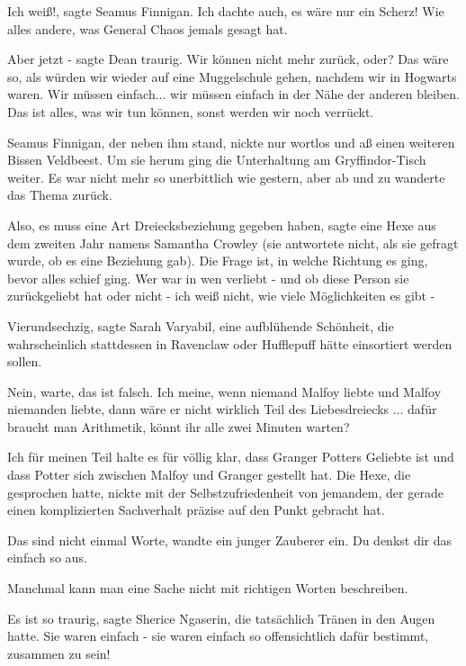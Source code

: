 \glqq{}Ich weiß!\grqq{}, sagte Seamus Finnigan. \glqq{}Ich dachte auch, es wäre
nur ein Scherz! Wie alles andere, was General Chaos jemals gesagt hat.\grqq{}

\glqq{}Aber jetzt -\grqq{} sagte Dean traurig. \glqq{}Wir können nicht mehr
zurück, oder? Das wäre so, als würden wir wieder auf eine Muggelschule gehen,
nachdem wir in Hogwarts waren. Wir müssen einfach... wir müssen einfach in der
Nähe der anderen bleiben. Das ist alles, was wir tun können, sonst werden wir
noch verrückt.\grqq{}

Seamus Finnigan, der neben ihm stand, nickte nur wortlos und aß einen weiteren
Bissen Veldbeest. Um sie herum ging die Unterhaltung am Gryffindor-Tisch weiter.
Es war nicht mehr so unerbittlich wie gestern, aber ab und zu wanderte das Thema
zurück.

\glqq{}Also, es muss eine Art Dreiecksbeziehung gegeben haben\grqq{}, sagte eine
Hexe aus dem zweiten Jahr namens Samantha Crowley (sie antwortete nicht, als sie
gefragt wurde, ob es eine Beziehung gab). \glqq{}Die Frage ist, in welche
Richtung es ging, bevor alles schief ging. Wer war in wen verliebt - und ob
diese Person sie zurückgeliebt hat oder nicht - ich weiß nicht, wie viele
Möglichkeiten es gibt -\grqq{}

\glqq{}Vierundsechzig\grqq{}, sagte Sarah Varyabil, eine aufblühende Schönheit,
die wahrscheinlich stattdessen in Ravenclaw oder Hufflepuff hätte einsortiert
werden sollen.

\glqq{}Nein, warte, das ist falsch. Ich meine, wenn niemand Malfoy liebte und
Malfoy niemanden liebte, dann wäre er nicht wirklich Teil des Liebesdreiecks ...
dafür braucht man Arithmetik, könnt ihr alle zwei Minuten warten?\grqq{}

\glqq{}Ich für meinen Teil halte es für völlig klar, dass Granger Potters
Geliebte ist und dass Potter sich zwischen Malfoy und Granger gestellt
hat.\grqq{} Die Hexe, die gesprochen hatte, nickte mit der Selbstzufriedenheit
von jemandem, der gerade einen komplizierten Sachverhalt präzise auf den Punkt
gebracht hat.

\glqq{}Das sind nicht einmal Worte\grqq{}, wandte ein junger Zauberer ein. \glqq{}
Du denkst dir das einfach so aus.\grqq{}

\glqq{}Manchmal kann man eine Sache nicht mit richtigen Worten
beschreiben.\grqq{}

\glqq{}Es ist so traurig\grqq{}, sagte Sherice Ngaserin, die tatsächlich Tränen
in den Augen hatte. \glqq{}Sie waren einfach - sie waren einfach so
offensichtlich dafür bestimmt, zusammen zu sein!\grqq{}

